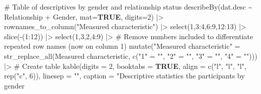 \documentclass[
  bookmarksnumbered]{article}
\newenvironment{Shaded}{\begin{snugshade}}{\end{snugshade}}
\newcommand{\AttributeTok}[1]{\textcolor[rgb]{0.80,0.80,0.80}{#1}}
\newcommand{\CommentTok}[1]{\textcolor[rgb]{0.50,0.62,0.50}{#1}}
\newcommand{\ConstantTok}[1]{\textcolor[rgb]{0.86,0.64,0.64}{\textbf{#1}}}
\newcommand{\DecValTok}[1]{\textcolor[rgb]{0.86,0.86,0.80}{#1}}
\newcommand{\FunctionTok}[1]{\textcolor[rgb]{0.94,0.94,0.56}{#1}}
\newcommand{\NormalTok}[1]{\textcolor[rgb]{0.80,0.80,0.80}{#1}}
\newcommand{\OtherTok}[1]{\textcolor[rgb]{0.94,0.94,0.56}{#1}}
\newcommand{\SpecialCharTok}[1]{\textcolor[rgb]{0.86,0.64,0.64}{#1}}
\newcommand{\StringTok}[1]{\textcolor[rgb]{0.80,0.58,0.58}{#1}}
\begin{document}
\begin{Shaded}
\begin{Highlighting}[]
\CommentTok{\# Table of descriptives by gender and relationship status}
\FunctionTok{describeBy}\NormalTok{(dat.desc }\SpecialCharTok{\textasciitilde{}}\NormalTok{ Relationship }\SpecialCharTok{+}\NormalTok{ Gender,}
           \AttributeTok{mat=}\ConstantTok{TRUE}\NormalTok{,}
           \AttributeTok{digits=}\DecValTok{2}\NormalTok{)  }\SpecialCharTok{|\textgreater{}} 
  \FunctionTok{rownames\_to\_column}\NormalTok{(}\StringTok{"Measured characteristic"}\NormalTok{) }\SpecialCharTok{|\textgreater{}}
  \FunctionTok{select}\NormalTok{(}\DecValTok{1}\NormalTok{,}\DecValTok{3}\SpecialCharTok{:}\DecValTok{4}\NormalTok{,}\DecValTok{6}\SpecialCharTok{:}\DecValTok{9}\NormalTok{,}\DecValTok{12}\SpecialCharTok{:}\DecValTok{13}\NormalTok{) }\SpecialCharTok{|\textgreater{}} 
  \FunctionTok{slice}\NormalTok{(}\SpecialCharTok{{-}}\NormalTok{(}\DecValTok{1}\SpecialCharTok{:}\DecValTok{12}\NormalTok{)) }\SpecialCharTok{|\textgreater{}} 
  \FunctionTok{select}\NormalTok{(}\DecValTok{1}\NormalTok{,}\DecValTok{3}\NormalTok{,}\DecValTok{2}\NormalTok{,}\DecValTok{4}\SpecialCharTok{:}\DecValTok{9}\NormalTok{) }\SpecialCharTok{|\textgreater{}} 
  \CommentTok{\# Remove numbers included to differentiate repeated row names (now on column 1)}
  \FunctionTok{mutate}\NormalTok{(}\StringTok{"Measured characteristic"} \OtherTok{=} \FunctionTok{str\_replace\_all}\NormalTok{(}\StringTok{\textasciigrave{}}\AttributeTok{Measured characteristic}\StringTok{\textasciigrave{}}\NormalTok{,}
                                                     \FunctionTok{c}\NormalTok{(}\StringTok{"1"} \OtherTok{=} \StringTok{""}\NormalTok{, }
                                                       \StringTok{"2"} \OtherTok{=} \StringTok{""}\NormalTok{, }
                                                       \StringTok{"3"} \OtherTok{=} \StringTok{""}\NormalTok{, }
                                                       \StringTok{"4"} \OtherTok{=} \StringTok{""}\NormalTok{))) }\SpecialCharTok{|\textgreater{}} 
  \CommentTok{\# Create table}
  \FunctionTok{kable}\NormalTok{(}\AttributeTok{digits =} \DecValTok{2}\NormalTok{,}
        \AttributeTok{booktabs =} \ConstantTok{TRUE}\NormalTok{,}
        \AttributeTok{align =} \FunctionTok{c}\NormalTok{(}\StringTok{"l"}\NormalTok{, }\StringTok{"l"}\NormalTok{, }\StringTok{"l"}\NormalTok{, }\FunctionTok{rep}\NormalTok{(}\StringTok{"c"}\NormalTok{, }\DecValTok{6}\NormalTok{)),}
        \AttributeTok{linesep =} \StringTok{""}\NormalTok{,}
        \AttributeTok{caption =} \StringTok{"Descriptive statistics the participants by gender}

\end{Highlighting}
\end{Shaded}
\end{document}
